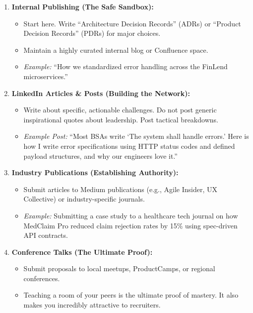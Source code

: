 \documentclass[
  11pt,
  openany,
  oneside]{book}
\providecommand{\tightlist}{%
  \setlength{\itemsep}{0pt}\setlength{\parskip}{0pt}}
\begin{document}
\begin{enumerate}
\def\labelenumi{\arabic{enumi}.}
\tightlist
\item
  \textbf{Internal Publishing (The Safe Sandbox):}

  \begin{itemize}
  \tightlist
  \item
    Start here. Write ``Architecture Decision Records'' (ADRs) or
    ``Product Decision Records'' (PDRs) for major choices.
  \item
    Maintain a highly curated internal blog or Confluence space.
  \item
    \emph{Example:} ``How we standardized error handling across the
    FinLend microservices.''
  \end{itemize}
\item
  \textbf{LinkedIn Articles \& Posts (Building the Network):}

  \begin{itemize}
  \tightlist
  \item
    Write about specific, actionable challenges. Do not post generic
    inspirational quotes about leadership. Post tactical breakdowns.
  \item
    \emph{Example Post:} ``Most BSAs write `The system shall handle
    errors.' Here is how I write error specifications using HTTP status
    codes and defined payload structures, and why our engineers love
    it.''
  \end{itemize}
\item
  \textbf{Industry Publications (Establishing Authority):}

  \begin{itemize}
  \tightlist
  \item
    Submit articles to Medium publications (e.g., Agile Insider, UX
    Collective) or industry-specific journals.
  \item
    \emph{Example:} Submitting a case study to a healthcare tech journal
    on how MedClaim Pro reduced claim rejection rates by 15\% using
    spec-driven API contracts.
  \end{itemize}
\item
  \textbf{Conference Talks (The Ultimate Proof):}

  \begin{itemize}
  \tightlist
  \item
    Submit proposals to local meetups, ProductCamps, or regional
    conferences.
  \item
    Teaching a room of your peers is the ultimate proof of mastery. It
    also makes you incredibly attractive to recruiters.
  \end{itemize}
\end{enumerate}
\end{document}
